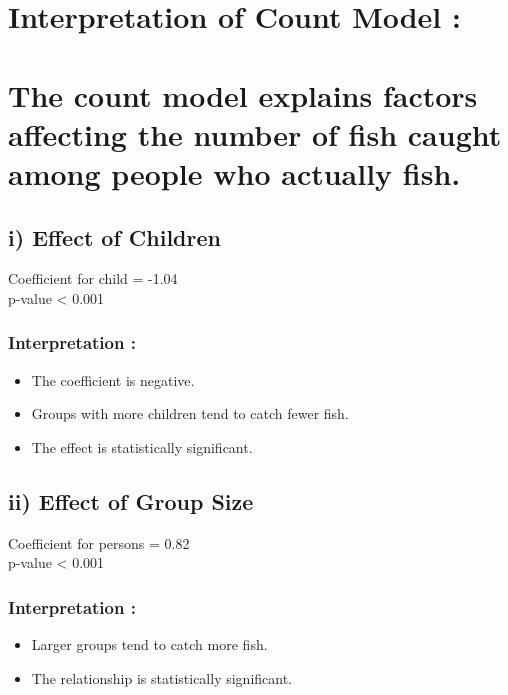 \documentclass[
]{article}
\begin{document}
\section{\texorpdfstring{\textbf{Interpretation of Count Model
:}}{Interpretation of Count Model :}}\label{interpretation-of-count-model}

\section{The count model explains factors affecting the number of fish
caught among people who actually
fish.}\label{the-count-model-explains-factors-affecting-the-number-of-fish-caught-among-people-who-actually-fish.}

\subsection{i) Effect of Children}\label{i-effect-of-children}

Coefficient for child = -1.04\\
p-value \textless{} 0.001

\subsubsection{Interpretation :}\label{interpretation-18}

\begin{itemize}
\item
  The coefficient is negative.
\item
  Groups with more children tend to catch fewer fish.
\item
  The effect is statistically significant.
\end{itemize}

\subsection{ii) Effect of Group Size}\label{ii-effect-of-group-size}

Coefficient for persons = 0.82\\
p-value \textless{} 0.001

\subsubsection{Interpretation :}\label{interpretation-19}

\begin{itemize}
\item
  Larger groups tend to catch more fish.
\item
  The relationship is statistically significant.
\end{itemize}
\end{document}
